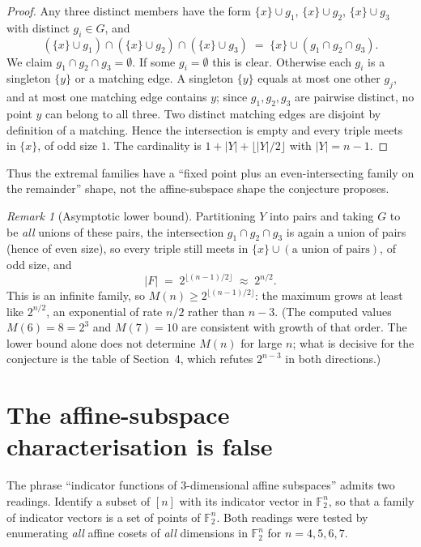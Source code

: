 \documentclass[11pt]{article}
\theoremstyle{definition}
\theoremstyle{remark}
\newtheorem{remark}[theorem]{Remark}
\newcommand{\F}{\mathbb{F}}
\begin{document}
\begin{proof}
Any three distinct members have the form $\{x\} \cup g_1$, $\{x\} \cup g_2$,
$\{x\} \cup g_3$ with distinct $g_i \in G$, and
\[
(\{x\}\cup g_1)\cap(\{x\}\cup g_2)\cap(\{x\}\cup g_3)
\;=\; \{x\} \cup (g_1 \cap g_2 \cap g_3).
\]
We claim $g_1 \cap g_2 \cap g_3 = \emptyset$. If some $g_i = \emptyset$ this is
clear. Otherwise each $g_i$ is a singleton $\{y\}$ or a matching edge. A
singleton $\{y\}$ equals at most one other $g_j$, and at most one matching edge
contains $y$; since $g_1, g_2, g_3$ are pairwise distinct, no point $y$ can
belong to all three. Two distinct matching edges are disjoint by definition of a
matching. Hence the intersection is empty and every triple meets in $\{x\}$, of
odd size $1$. The cardinality is $1 + |Y| + \lfloor |Y|/2 \rfloor$ with
$|Y| = n-1$.
\end{proof}

Thus the extremal families have a ``fixed point plus an even-intersecting family
on the remainder'' shape, not the affine-subspace shape the conjecture proposes.

\begin{remark}[Asymptotic lower bound]
Partitioning $Y$ into pairs and taking $G$ to be \emph{all} unions of these
pairs, the intersection $g_1 \cap g_2 \cap g_3$ is again a union of pairs (hence
of even size), so every triple still meets in $\{x\} \cup (\text{a union of
pairs})$, of odd size, and
\[
|F| \;=\; 2^{\lfloor (n-1)/2 \rfloor} \;\approx\; 2^{n/2}.
\]
This is an infinite family, so $M(n) \ge 2^{\lfloor (n-1)/2 \rfloor}$: the
maximum grows at least like $2^{n/2}$, an exponential of rate $n/2$ rather than
$n-3$. (The computed values $M(6) = 8 = 2^3$ and $M(7) = 10$ are consistent
with growth of that order. The lower bound alone does not determine $M(n)$ for
large $n$; what is decisive for the conjecture is the table of Section~4, which
refutes $2^{n-3}$ in both directions.)
\end{remark}

\section{The affine-subspace characterisation is false}

The phrase ``indicator functions of 3-dimensional affine subspaces'' admits two
readings. Identify a subset of $[n]$ with its indicator vector in $\F_2^n$, so
that a family of indicator vectors is a set of points of $\F_2^n$. Both readings
were tested by enumerating \emph{all} affine cosets of \emph{all} dimensions in
$\F_2^n$ for $n = 4, 5, 6, 7$.
\end{document}
